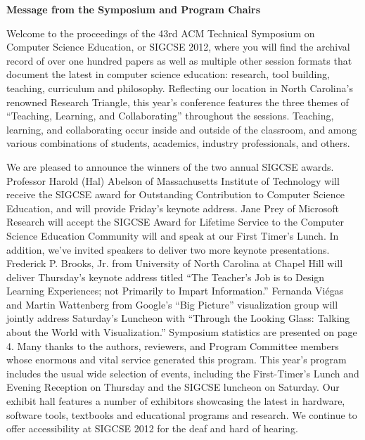 

% 
\newpage
\begin{center}
{\Large \textbf{\textsf{Message from the Symposium and Program Chairs}}}
\end{center}

Welcome to the proceedings of the 43rd ACM Technical Symposium on Computer Science Education, or SIGCSE 2012, where you will find the archival record of over one hundred papers as well as multiple other session formats that document the latest in computer science education: research, tool building, teaching, curriculum and philosophy. Reflecting our location in North Carolina’s renowned Research Triangle, this year’s conference features the three themes of “Teaching, Learning, and Collaborating” throughout the sessions. Teaching, learning, and collaborating occur inside and outside of the classroom, and among various combinations of students, academics, industry professionals, and others.
\vspace{0.5\baselineskip}

We are pleased to announce the winners of the two annual SIGCSE awards. Professor Harold (Hal) Abelson of Massachusetts Institute of Technology will receive the SIGCSE award for Outstanding Contribution to Computer Science Education, and will provide Friday’s keynote address. Jane Prey of Microsoft Research will accept the SIGCSE Award for Lifetime Service to the Computer Science Education Community will and speak at our First Timer’s Lunch. In addition, we’ve invited speakers to deliver two more keynote presentations. Frederick P. Brooks, Jr. from University of North Carolina at Chapel Hill will deliver Thursday’s keynote address titled “The Teacher’s Job is to Design Learning Experiences; not Primarily to Impart Information.” Fernanda Viégas and Martin Wattenberg from Google’s “Big Picture” visualization group will jointly address Saturday’s Luncheon with “Through the Looking Glass: Talking about the World with Visualization.” Symposium statistics are presented on page 4. Many thanks to the authors, reviewers, and Program Committee members whose enormous and vital service generated this program. This year’s program includes the usual wide selection of events, including the First-Timer’s Lunch and Evening Reception on Thursday and the SIGCSE luncheon on Saturday. Our exhibit hall features a number of exhibitors showcasing the latest in hardware, software tools, textbooks and educational programs and research. We continue to offer accessibility at SIGCSE 2012 for the deaf and hard of hearing. 
\vspace{0.5\baselineskip}

